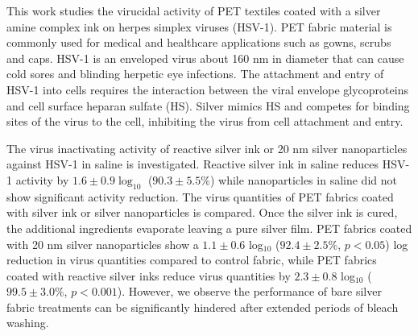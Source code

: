 \documentclass[journal=jacsat,manuscript=article]{achemso}
\begin{document}
This work studies the virucidal activity of
PET textiles coated with a silver amine complex ink \cite{Walker:12}
on herpes simplex viruses (HSV-1).  
PET fabric material is commonly used for medical and healthcare applications such as gowns, scrubs and caps. \cite{Rigby:97} 
HSV-1 is an enveloped virus about 160 nm in diameter that can cause cold sores and blinding herpetic eye infections.\cite{wald:07} 
The attachment and entry of HSV-1 into cells requires the interaction between the viral envelope glycoproteins and cell surface heparan sulfate (HS).\cite{baram-pinto_2009} Silver mimics HS and competes for binding sites of the virus to the cell, inhibiting the virus from cell attachment and entry.\cite{baram-pinto_2009,Galdiero:11}

The virus inactivating activity of reactive silver ink or 20 nm silver nanoparticles against HSV-1 in saline is investigated.
Reactive silver ink in saline reduces HSV-1 activity by $1.6 \pm 0.9 \log_{10}$ ($90.3 \pm 5.5 \%$) while nanoparticles in saline did not show significant activity reduction.  
The virus quantities of PET fabrics coated with silver ink or silver nanoparticles is compared. Once the silver ink is cured, the additional ingredients evaporate leaving a pure silver film.  
PET fabrics coated with 20 nm silver nanoparticles %
show a $1.1 \pm 0.6$ log$_{10}$ ($92.4 \pm 2.5 \%$, $p < 0.05$) log reduction in virus quantities compared to control fabric, 
while PET fabrics coated with reactive silver inks reduce virus quantities by $2.3 \pm 0.8$ log$_{10}$ ($99.5 \pm 3.0 \%$, $p < 0.001$). 
However, we observe the performance of bare silver fabric treatments can be significantly hindered after extended periods of bleach washing. 


\end{document}

